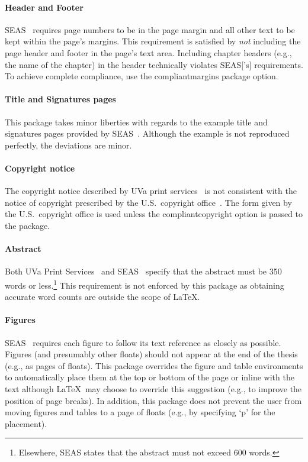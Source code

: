 \documentclass[10pt]{article}
\newcommand{\option}[1]{#1}
\begin{document}
\paragraph{Header and Footer}
\Gls{SEAS}~\cite{seas:instructions} requires page numbers to be in the page margin and all other text to be kept within the page's margins.
This requirement is satisfied by \emph{not} including the page header and footer in the page's text area.
Including chapter headers (e.g., the name of the chapter) in the header technically violates \gls{SEAS}['s] requirements.
To achieve complete compliance, use the \option{compliantmargins} package option.

\paragraph{Title and Signatures pages}
This package takes minor liberties with regards to the example title and signatures pages provided by \Gls{SEAS}~\cite{seas:instructions}.
Although the example is not reproduced perfectly, the deviations are minor.

\paragraph{Copyright notice}
The copyright notice described by \gls{UVa} print services~\cite{uvaprint:thesis} is not consistent with the notice of copyright prescribed by the U.S.\ copyright office~\cite{copyright2010copyright}.
The form given by the U.S.\ copyright office is used unless the \option{compliantcopyright} option is passed to the package.

\paragraph{Abstract}
Both \Gls{UVa} Print Services~\cite{uvaprint:thesis} and \gls{SEAS}~\cite{seas:instructions} specify that the abstract must be 350 words or less.\footnote{
  Elsewhere, \gls{SEAS} states that the abstract must not exceed 600 words.
}
This requirement is not enforced by this package as obtaining accurate word counts are outside the scope of \LaTeX.

\paragraph{Figures}
\Gls{SEAS}~\cite{seas:instructions} requires each figure to follow its text reference as closely as possible.
Figures (and presumably other floats) should not appear at the end of the thesis (e.g., as pages of floats).
This package overrides the figure and table environments to automatically place them at the top or bottom of the page or inline with the text although \LaTeX\ may choose to override this suggestion (e.g., to improve the position of page breaks).
In addition, this package does not prevent the user from moving figures and tables to a page of floats (e.g., by specifying `p' for the placement).
\end{document}
